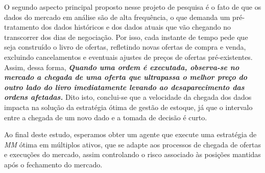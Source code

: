 O segundo aspecto principal proposto nesse projeto de pesquisa é o fato de que os dados do mercado em análise são de alta frequência, o que demanda um pré-tratamento dos dados históricos e dos dados atuais que vão chegando no transcorrer dos dias de negociação. Por isso, cada instante de tempo pede que seja construído o livro de ofertas, refletindo novas ofertas de compra e venda, excluindo cancelamentos e eventuais ajustes de preços de ofertas pré-existentes. Assim, dessa forma, \textbf{\textit{Quando uma ordem é executada, observa-se no mercado a chegada de uma oferta que ultrapassa o melhor preço do outro lado do livro imediatamente levando ao desaparecimento das ordens afetadas.}}
Dito isto, conclui-se que a velocidade da chegada dos dados impacta na solução da estratégia ótima de gestão de estoque, já que o intervalo entre a chegada de um novo dado e a tomada de decisão é curto.

Ao final deste estudo, esperamos obter um agente que execute uma estratégia de \textit{MM} ótima em múltiplos ativos, que se adapte aos processos de chegada de ofertas e execuções do mercado, assim controlando o risco associado às posições mantidas após o fechamento do mercado.

